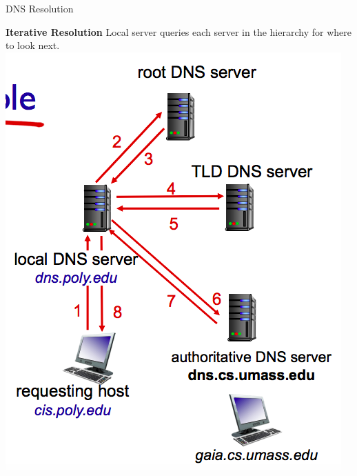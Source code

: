 \begin{topic}{DNS Resolution}
\begin{multicols}{2}
\textbf{Iterative Resolution}
Local server queries each server in the hierarchy for where to look next.
\includegraphics[scale=0.35]{coms3200/images/dnsresiter}

\columnbreak


\end{multicols}
\end{topic}
